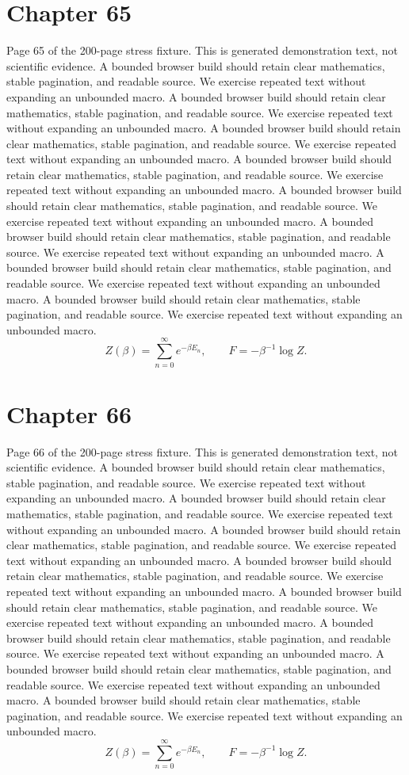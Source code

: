 \documentclass[11pt]{article}
\begin{document}
\section*{Chapter 65}
Page 65 of the 200-page stress fixture. This is generated demonstration text, not scientific evidence.
A bounded browser build should retain clear mathematics, stable pagination, and readable source. We exercise repeated text without expanding an unbounded macro.
A bounded browser build should retain clear mathematics, stable pagination, and readable source. We exercise repeated text without expanding an unbounded macro.
A bounded browser build should retain clear mathematics, stable pagination, and readable source. We exercise repeated text without expanding an unbounded macro.
A bounded browser build should retain clear mathematics, stable pagination, and readable source. We exercise repeated text without expanding an unbounded macro.
A bounded browser build should retain clear mathematics, stable pagination, and readable source. We exercise repeated text without expanding an unbounded macro.
A bounded browser build should retain clear mathematics, stable pagination, and readable source. We exercise repeated text without expanding an unbounded macro.
A bounded browser build should retain clear mathematics, stable pagination, and readable source. We exercise repeated text without expanding an unbounded macro.
A bounded browser build should retain clear mathematics, stable pagination, and readable source. We exercise repeated text without expanding an unbounded macro.
\[Z(\beta)=\sum_{n=0}^{\infty}e^{-\beta E_n},\qquad F=-\beta^{-1}\log Z.\]
\newpage
\section*{Chapter 66}
Page 66 of the 200-page stress fixture. This is generated demonstration text, not scientific evidence.
A bounded browser build should retain clear mathematics, stable pagination, and readable source. We exercise repeated text without expanding an unbounded macro.
A bounded browser build should retain clear mathematics, stable pagination, and readable source. We exercise repeated text without expanding an unbounded macro.
A bounded browser build should retain clear mathematics, stable pagination, and readable source. We exercise repeated text without expanding an unbounded macro.
A bounded browser build should retain clear mathematics, stable pagination, and readable source. We exercise repeated text without expanding an unbounded macro.
A bounded browser build should retain clear mathematics, stable pagination, and readable source. We exercise repeated text without expanding an unbounded macro.
A bounded browser build should retain clear mathematics, stable pagination, and readable source. We exercise repeated text without expanding an unbounded macro.
A bounded browser build should retain clear mathematics, stable pagination, and readable source. We exercise repeated text without expanding an unbounded macro.
A bounded browser build should retain clear mathematics, stable pagination, and readable source. We exercise repeated text without expanding an unbounded macro.
\[Z(\beta)=\sum_{n=0}^{\infty}e^{-\beta E_n},\qquad F=-\beta^{-1}\log Z.\]
\newpage
\end{document}
